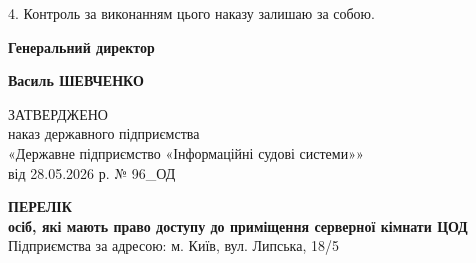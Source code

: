 \documentclass[12pt]{article}
\begin{document}
4. Контроль за виконанням цього наказу залишаю за собою.

\vspace{1.5cm}

\noindent
\parbox[t]{0.5\textwidth}{\bfseries Генеральний директор}%
\parbox[t]{0.5\textwidth}{\raggedleft{}\bfseries Василь ШЕВЧЕНКО}

\newpage

\begin{flushright}
ЗАТВЕРДЖЕНО\\
наказ державного підприємства\\
«Державне підприємство «Інформаційні судові системи»»\\
від 28.05.2026 р. № 96\_\allowbreak{}ОД
\end{flushright}

\vspace{0.5cm}

\begin{center}
  \textbf{\Large{}ПЕРЕЛІК}\\
  \textbf{\large{}осіб, які мають право доступу до приміщення серверної кімнати ЦОД}\\
  Підприємства за адресою: м. Київ, вул. Липська, 18/5
\end{center}

\vspace{0.8cm}
\end{document}
